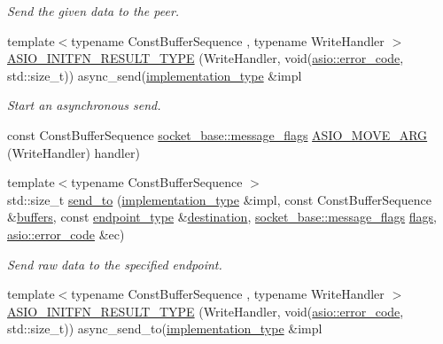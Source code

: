 \begin{DoxyCompactItemize}
\begin{DoxyCompactList}\small\item\em Send the given data to the peer. \end{DoxyCompactList}\item 
{\footnotesize template$<$typename Const\+Buffer\+Sequence , typename Write\+Handler $>$ }\\\hyperlink{classasio_1_1raw__socket__service_ac01c6e124779ee50915302874b4a7d74}{A\+S\+I\+O\+\_\+\+I\+N\+I\+T\+F\+N\+\_\+\+R\+E\+S\+U\+L\+T\+\_\+\+T\+Y\+P\+E} (Write\+Handler, void(\hyperlink{classasio_1_1error__code}{asio\+::error\+\_\+code}, std\+::size\+\_\+t)) async\+\_\+send(\hyperlink{classasio_1_1raw__socket__service_aa2e0ef73d6504fbcab510cb835e9e3d9}{implementation\+\_\+type} \&impl
\begin{DoxyCompactList}\small\item\em Start an asynchronous send. \end{DoxyCompactList}\item 
const Const\+Buffer\+Sequence \hyperlink{classasio_1_1socket__base_ac3cf77465dfedfe1979b5415cf32cc94}{socket\+\_\+base\+::message\+\_\+flags} \hyperlink{classasio_1_1raw__socket__service_a57f14c2fd09c3b93b2079a1d367ffcd8}{A\+S\+I\+O\+\_\+\+M\+O\+V\+E\+\_\+\+A\+R\+G} (Write\+Handler) handler)
\item 
{\footnotesize template$<$typename Const\+Buffer\+Sequence $>$ }\\std\+::size\+\_\+t \hyperlink{classasio_1_1raw__socket__service_a00a843cedf0147e2b82c48698657fde8}{send\+\_\+to} (\hyperlink{classasio_1_1raw__socket__service_aa2e0ef73d6504fbcab510cb835e9e3d9}{implementation\+\_\+type} \&impl, const Const\+Buffer\+Sequence \&\hyperlink{classasio_1_1raw__socket__service_a45cf013e3c3889296ee65fd303253db6}{buffers}, const \hyperlink{classasio_1_1raw__socket__service_a8278f352f4e4424d431320f924e8b496}{endpoint\+\_\+type} \&\hyperlink{classasio_1_1raw__socket__service_a862ad7c956d71979dbe3702d78540643}{destination}, \hyperlink{classasio_1_1socket__base_ac3cf77465dfedfe1979b5415cf32cc94}{socket\+\_\+base\+::message\+\_\+flags} \hyperlink{classasio_1_1raw__socket__service_a735387eb54985dafc0ba5314df84590a}{flags}, \hyperlink{classasio_1_1error__code}{asio\+::error\+\_\+code} \&ec)
\begin{DoxyCompactList}\small\item\em Send raw data to the specified endpoint. \end{DoxyCompactList}\item 
{\footnotesize template$<$typename Const\+Buffer\+Sequence , typename Write\+Handler $>$ }\\\hyperlink{classasio_1_1raw__socket__service_a7a270306e1b7a907bb03d55abf859bd5}{A\+S\+I\+O\+\_\+\+I\+N\+I\+T\+F\+N\+\_\+\+R\+E\+S\+U\+L\+T\+\_\+\+T\+Y\+P\+E} (Write\+Handler, void(\hyperlink{classasio_1_1error__code}{asio\+::error\+\_\+code}, std\+::size\+\_\+t)) async\+\_\+send\+\_\+to(\hyperlink{classasio_1_1raw__socket__service_aa2e0ef73d6504fbcab510cb835e9e3d9}{implementation\+\_\+type} \&impl

\end{DoxyCompactItemize}
